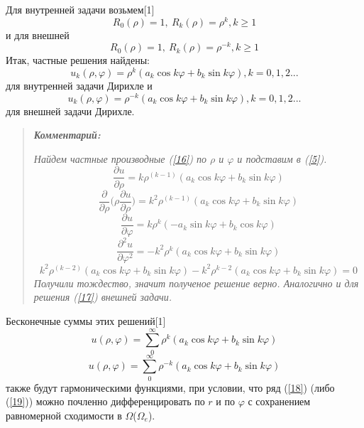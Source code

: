 \documentclass[14pt, a4paper]{extarticle}
\let\oldref\ref
\renewcommand{\ref}[1]{(\oldref{#1})}
\begin{document}
			Для внутренней задачи возьмем[1]
			\begin{equation}
				R_0(\rho) = 1,\: R_k(\rho) = \rho^k, k \geq 1
			\end{equation}
			и для внешней
						\begin{equation}
				R_0(\rho) = 1,\: R_k(\rho) = \rho^{-k}, k \geq 1
			\end{equation}
			Итак, частные решения найдены:
			\begin{equation}
				u_k(\rho, \varphi) = \rho^k(a_k \cos{k\varphi} + b_k \sin{k\varphi}), k = 0, 1, 2...  \label{16}
			\end{equation}
			для внутренней задачи Дирихле и
						\begin{equation}
				u_k(\rho, \varphi) = \rho^{-k}(a_k \cos{k\varphi} + b_k \sin{k\varphi}), k = 0, 1, 2... \label{17}
			\end{equation}
			для внешней задачи Дирихле.
			
			\begin{framed}
				\begin{quote}
			\textit{\textbf{Комментарий:}}
			
			\textit{
				Найдем частные производные \ref{16} по $\rho$ и $\varphi$ и подставим в \ref{5}.\\
					\[ \dfrac{\partial u}{\partial \rho} = k  \rho^{(k-1)} (a_k \cos{k\varphi} + b_k \sin{k\varphi}) \]
					\[ \dfrac{\partial}{\partial \rho} \bigg(  \rho \dfrac{\partial u}{\partial \rho} \bigg) = k^2 \rho^{(k-1)}  (a_k \cos{k\varphi} + b_k \sin{k\varphi}) \]
					\[ \dfrac{\partial u}{\partial \varphi} = k \rho^k ( - a_k \sin{k\varphi} + b_k \cos{k\varphi} ) \]
					\[ \dfrac{\partial^2 u}{\partial \varphi^2} = - k^2 \rho^k (a_k \cos{k\varphi} + b_k \sin{k\varphi}) \]
				\[  k^2 \rho^{(k-2)}  (a_k \cos{k\varphi} + b_k \sin{k\varphi})  -  k^2 \rho^{k-2} (a_k \cos{k\varphi} + b_k \sin{k\varphi}) = 0\]
				Получили тождество, значит полученое решение верно. Аналогично и для решения \ref{17} внешней задачи.
			}
						\end{quote}
			\end{framed}
			
			Бесконечные суммы этих решений[1]
			\begin{equation}
				u(\rho, \varphi) =  \sum_{0}^{\infty} \rho^k(a_k \cos{k\varphi} + b_k \sin{k\varphi}) \label{18}
			\end{equation}
			\begin{equation}
				u(\rho, \varphi) =  \sum_{0}^{\infty} \rho^{-k}(a_k \cos{k\varphi} + b_k \sin{k\varphi}) \label{19}
			\end{equation}
			также будут гармоническими функциями, при условии, что ряд \ref{18} (либо \ref{19}) можно почленно дифференцировать по $r$ и по $\varphi$ с сохранением равномерной сходимости в $\Omega$($\Omega_e$).
			
\end{document}
